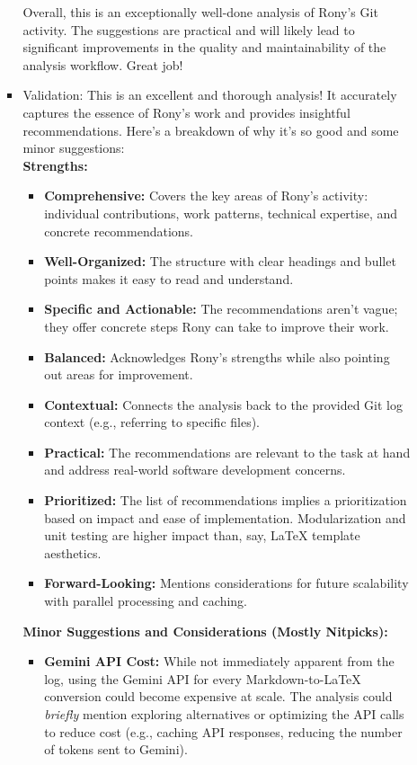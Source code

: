 \documentclass{article}
\begin{document}
\begin{itemize}
\begin{itemize}
\begin{itemize}
Overall, this is an exceptionally well-done analysis of Rony's Git activity. The suggestions are practical and will likely lead to significant improvements in the quality and maintainability of the analysis workflow.  Great job!
            \item Validation: This is an excellent and thorough analysis!  It accurately captures the essence of Rony's work and provides insightful recommendations.  Here's a breakdown of why it's so good and some minor suggestions: \\
\textbf{Strengths:}
\begin{itemize}
    \item \textbf{Comprehensive:} Covers the key areas of Rony's activity: individual contributions, work patterns, technical expertise, and concrete recommendations.
    \item \textbf{Well-Organized:}  The structure with clear headings and bullet points makes it easy to read and understand.
    \item \textbf{Specific and Actionable:}  The recommendations aren't vague; they offer concrete steps Rony can take to improve their work.
    \item \textbf{Balanced:}  Acknowledges Rony's strengths while also pointing out areas for improvement.
    \item \textbf{Contextual:} Connects the analysis back to the provided Git log context (e.g., referring to specific files).
    \item \textbf{Practical:} The recommendations are relevant to the task at hand and address real-world software development concerns.
    \item \textbf{Prioritized:} The list of recommendations implies a prioritization based on impact and ease of implementation.  Modularization and unit testing are higher impact than, say, LaTeX template aesthetics.
    \item \textbf{Forward-Looking:} Mentions considerations for future scalability with parallel processing and caching.
\end{itemize}
\textbf{Minor Suggestions and Considerations (Mostly Nitpicks):}
\begin{itemize}
    \item \textbf{Gemini API Cost:}  While not immediately apparent from the log, using the Gemini API for every Markdown-to-LaTeX conversion could become expensive at scale.  The analysis could \textit{briefly} mention exploring alternatives or optimizing the API calls to reduce cost (e.g., caching API responses, reducing the number of tokens sent to Gemini).

\end{itemize}
\end{itemize}
\end{itemize}
\end{itemize}
\end{document}
